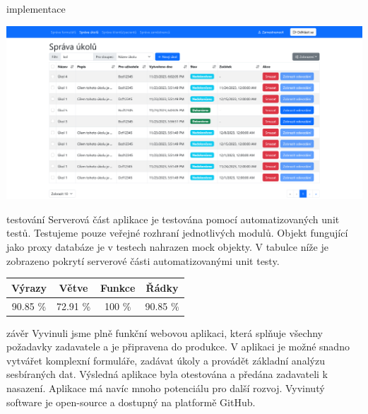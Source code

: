 \documentclass[portrait,a0paper,fontscale=0.25]{baposter}
\begin{document}
\begin{poster}
\begin{posterbox}[column=1, name=impl]{implementace}
            \begin{center}
                \includegraphics[width=\linewidth]{img/sprava-ukolu}
            \end{center}
        \end{posterbox}

        \begin{posterbox}[column=1, name=testing, below=impl]{testování}
            Serverová část aplikace je testována pomocí automatizovaných unit testů.
            Testujeme pouze veřejné rozhraní jednotlivých modulů.
            Objekt fungující jako proxy databáze je v testech nahrazen mock objekty.
            V tabulce níže je zobrazeno pokrytí serverové části automatizovanými unit testy.
            \begin{center}
                \begin{tabular}{c|c|c|c}
                    \textbf{Výrazy} & \textbf{Větve} & \textbf{Funkce} & \textbf{Řádky} \\
                    \hline
                    90.85 \%        & 72.91 \%       & 100 \%          & 90.85 \%       \\
                \end{tabular}
            \end{center}
        \end{posterbox}

        \begin{posterbox}[column=1, name=conclusion, below=testing]{závěr}
            Vyvinuli jsme plně funkční webovou aplikaci, která splňuje všechny požadavky zadavatele a je připravena do produkce.
            V aplikaci je možné snadno vytvářet komplexní formuláře, zadávat úkoly a provádět základní analýzu sesbíraných dat.
            Výsledná aplikace byla otestována a předána zadavateli k nasazení.
            Aplikace má navíc mnoho potenciálu pro další rozvoj.
            Vyvinutý software je open-source a dostupný na platformě GitHub.
        \end{posterbox}


\end{poster}
\end{document}
